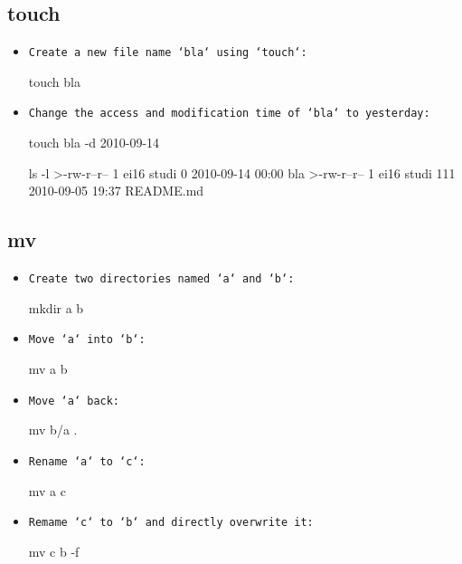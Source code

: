 \documentclass[10pt,a4paper]{scrartcl}
\begin{document}
\subsection{touch}

\begin{itemize}

\item \texttt{Create a new file name `bla` using `touch`:}
\begin{terminalcode}
touch bla
\end{terminalcode}

\item \texttt{Change the access and modification time of `bla` to yesterday:}
\begin{terminalcode}
touch bla -d 2010-09-14

ls -l
>-rw-r--r-- 1 ei16 studi   0 2010-09-14 00:00 bla
>-rw-r--r-- 1 ei16 studi 111 2010-09-05 19:37 README.md

\end{terminalcode}

\end{itemize}

\subsection{mv}

\begin{itemize}

\item \texttt{Create two directories named `a` and `b`:}

\begin{terminalcode}
mkdir a b
\end{terminalcode}

\item \texttt{Move `a` into `b`:}
\begin{terminalcode}
mv a b
\end{terminalcode}

\item \texttt{Move `a` back:}
\begin{terminalcode}
mv b/a .
\end{terminalcode}


\item \texttt{Rename `a` to `c`:}
\begin{terminalcode}
mv a c
\end{terminalcode}

\item \texttt{Remame `c` to `b` and directly overwrite it:}
\begin{terminalcode}
mv c b -f
\end{terminalcode}


\end{itemize}
\end{document}
